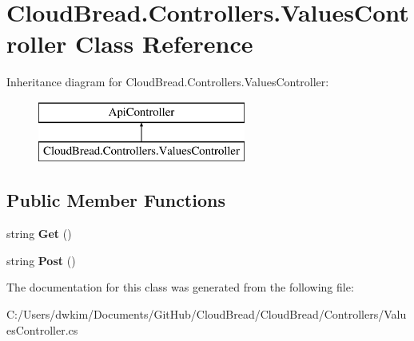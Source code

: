 \hypertarget{class_cloud_bread_1_1_controllers_1_1_values_controller}{}\section{Cloud\+Bread.\+Controllers.\+Values\+Controller Class Reference}
\label{class_cloud_bread_1_1_controllers_1_1_values_controller}
Inheritance diagram for Cloud\+Bread.\+Controllers.\+Values\+Controller\+:\begin{figure}[H]
\begin{center}
\leavevmode
\includegraphics[height=2.000000cm]{class_cloud_bread_1_1_controllers_1_1_values_controller}
\end{center}
\end{figure}
\subsection*{Public Member Functions}
\begin{DoxyCompactItemize}
\item 
string {\bfseries Get} ()\hypertarget{class_cloud_bread_1_1_controllers_1_1_values_controller_a006b33398670b2d47415550a0698dc72}{}\label{class_cloud_bread_1_1_controllers_1_1_values_controller_a006b33398670b2d47415550a0698dc72}

\item 
string {\bfseries Post} ()\hypertarget{class_cloud_bread_1_1_controllers_1_1_values_controller_aa7859fb5c25a0d88c080fae31f4feb1c}{}\label{class_cloud_bread_1_1_controllers_1_1_values_controller_aa7859fb5c25a0d88c080fae31f4feb1c}

\end{DoxyCompactItemize}


The documentation for this class was generated from the following file\+:\begin{DoxyCompactItemize}
\item 
C\+:/\+Users/dwkim/\+Documents/\+Git\+Hub/\+Cloud\+Bread/\+Cloud\+Bread/\+Controllers/Values\+Controller.\+cs\end{DoxyCompactItemize}
